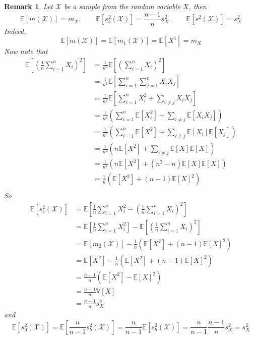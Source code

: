 \documentclass[12pt]{article}
\newtheorem{remark}[theorem]{Remark}
\begin{document}
\begin{remark}\label{ExpecStats} Let $\mathscr{X}$ be a sample from the random
    variable $X$, then
    $$
        \mathbb{E}[m(\mathscr{X})]=m_X,
        \quad\quad
        \mathbb{E}[s_b^2(\mathscr{X})]=\frac{n-1}{n}s_X^2,
        \quad\quad
        \mathbb{E}[s^2(\mathscr{X})]=s_X^2
    $$
    Indeed,
    $$
        \mathbb{E}[m(\mathscr{X})]
        =\mathbb{E}[m_{1}(\mathscr{X})]
        =\mathbb{E}[X^1]=m_X
    $$
    Now note that
    \begin{align*}
        \mathbb{E}\left[{\left(\frac{1}{n}\sum_{i=1}^n X_i\right)}^2\right]
         & =\frac{1}{n^2}
        \mathbb{E}\left[{\left(\sum_{i=1}^n X_i\right)}^2\right]        \\
         & =\frac{1}{n^2}
        \mathbb{E}\left[\sum_{i=1}^n\sum_{j=1}^n X_i X_j\right]         \\
         & =\frac{1}{n^2}
        \mathbb{E}\left[\sum_{i=1}^n X_i^2+\sum_{i\neq j}X_i X_j\right] \\
         & =\frac{1}{n^2}
        \left(\sum_{i=1}^n\mathbb{E}[X_i^2]
        +\sum_{i\neq j}\mathbb{E}[X_i X_j]\right)                       \\
         & =\frac{1}{n^2}
        \left(\sum_{i=1}^n\mathbb{E}[X^2]
        +\sum_{i\neq j}\mathbb{E}[X_i]\mathbb{E}[X_j]\right)            \\
         & =\frac{1}{n^2}
        \left(n\mathbb{E}[X^2]
        +\sum_{i\neq j}\mathbb{E}[X]\mathbb{E}[X]\right)                \\
         & =\frac{1}{n^2}
        \left(n\mathbb{E}[X^2]+(n^2-n)\mathbb{E}[X]\mathbb{E}[X]\right) \\
         & =\frac{1}{n}
        \left(\mathbb{E}[X^2]+(n-1){\mathbb{E}[X]}^2\right)             \\
    \end{align*}
    So
    \begin{align*}
        \mathbb{E}[s_b^2(\mathscr{X})]
         & =\mathbb{E}\left[\frac{1}{n}\sum_{i=1}^n X_i^2
        -{\left(\frac{1}{n}\sum_{i=1}^n X_i\right)}^2\right]                 \\
         & =\mathbb{E}\left[\frac{1}{n}\sum_{i=1}^n X_i^2\right]
        -\mathbb{E}\left[{\left(\frac{1}{n}\sum_{i=1}^n X_i\right)}^2\right] \\
         & =\mathbb{E}[m_{2}(\mathscr{X})]
        -\frac{1}{n}\left(\mathbb{E}[X^2]+(n-1){\mathbb{E}[X]}^2\right)      \\
         & =\mathbb{E}[X^2]
        -\frac{1}{n}\left(\mathbb{E}[X^2]+(n-1){\mathbb{E}[X]}^2\right)      \\
         & =\frac{n-1}{n}(\mathbb{E}[X^2]
        -{\mathbb{E}[X]}^2)                                                  \\
         & =\frac{n-1}{n}\mathbb{V}[X]                                       \\
         & =\frac{n-1}{n}s_X^2
    \end{align*}
    and
    $$
        \mathbb{E}[s_{0}^2(\mathscr{X})]
        =\mathbb{E}[\frac{n}{n-1}s_b^2(\mathscr{X})]
        =\frac{n}{n-1}\mathbb{E}[s_b^2(\mathscr{X})]
        =\frac{n}{n-1}\frac{n-1}{n}s_X^2
        =s_X^2
    $$
\end{remark}
\end{document}
